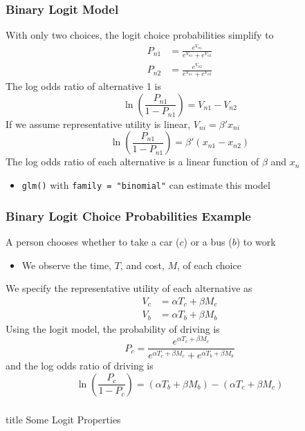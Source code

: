 \documentclass{beamer}\usepackage[]{graphicx}\usepackage[]{color}
\begin{document}
\begin{frame}\frametitle{Binary Logit Model}
    With only two choices, the logit choice probabilities simplify to
    \begin{align*}
    	P_{n1} &= \frac{e^{V_{n1}}}{e^{V_{n1}} + e^{V_{n2}}} \\
    	P_{n2} &= \frac{e^{V_{n2}}}{e^{V_{n1}} + e^{V_{n2}}}
    \end{align*}
    The log odds ratio of alternative 1 is
    $$\ln \left( \frac{P_{n1}}{1 - P_{n1}} \right) = V_{n1} - V_{n2}$$
    If we assume representative utility is linear, $V_{ni} = \beta' x_{ni}$
    $$\ln \left( \frac{P_{n1}}{1 - P_{n1}} \right) = \beta' (x_{n1} - x_{n2})$$
    The log odds ratio of each alternative is a linear function of $\beta$ and $x_n$
    \begin{itemize}
    	\item \texttt{glm()} with \texttt{family = "binomial"} can estimate this model
    \end{itemize}
\end{frame}

\begin{frame}\frametitle{Binary Logit Choice Probabilities Example}
    A person chooses whether to take a car ($c$) or a bus ($b$) to work
    \begin{itemize}
    	\item We observe the time, $T$, and cost, $M$, of each choice
    \end{itemize}
    \vspace{1ex}
    We specify the representative utility of each alternative as
    \begin{align*}
    	V_c &= \alpha T_c + \beta M_c \\
    	V_b &= \alpha T_b + \beta M_b
    \end{align*}
    Using the logit model, the probability of driving is
    $$P_c = \frac{e^{\alpha T_c + \beta M_c}}{e^{\alpha T_c + \beta M_c} + e^{\alpha T_b + \beta M_b}}$$
    and the log odds ratio of driving is
    $$\ln \left( \frac{P_c}{1 - P_c} \right) = (\alpha T_b + \beta M_b) - (\alpha T_c + \beta M_c)$$
\end{frame}

\begin{frame}\frametitle{}
    \vfill
    \centering
    \begin{beamercolorbox}[center]{title}
        \Large Some Logit Properties
    \end{beamercolorbox}
    \vfill
\end{frame}
\end{document}
